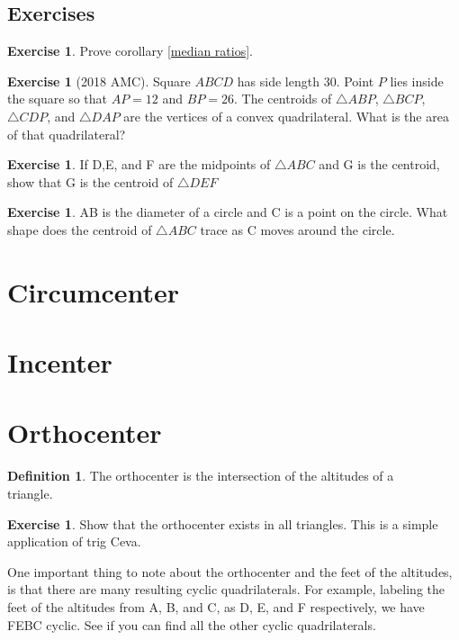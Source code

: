 \documentclass[letterpaper]{article}
\theoremstyle{plain}
\theoremstyle{definition}
\newtheorem{definition}[thm]{Definition}
\newtheorem{exercise}[thm]{Exercise}
\theoremstyle{remark}
\begin{document}
    \subsection*{Exercises}
    \begin{exercise}
        Prove corollary \ref{median ratios}.
    \end{exercise}
    \begin{exercise}[2018 AMC]
        Square $ABCD$ has side length $30$. Point $P$ lies inside the square so that $AP = 12$ and $BP = 26$. The centroids of $\triangle{ABP}$, $\triangle{BCP}$, $\triangle{CDP}$, and $\triangle{DAP}$ are the vertices of a convex quadrilateral. What is the area of that quadrilateral?
    \end{exercise}
    \begin{exercise} If D,E, and F are the midpoints of $\triangle ABC$ and G is the centroid, show that G is the centroid of $\triangle DEF$
    \end{exercise}
    \begin{exercise} AB is the diameter of a circle and C is a point on the circle. What shape does the centroid of $\triangle ABC$ trace as C moves around the circle.
    \end{exercise}

\section{Circumcenter}
\section{Incenter}
\section{Orthocenter}
\begin{mdframed}
    \begin{definition}
        The orthocenter is the intersection of the altitudes of a \\triangle.
   \end{definition} 
\end{mdframed}
\begin{exercise}
    Show that the orthocenter exists in all triangles. This is a simple application of trig Ceva.
\end{exercise}

One important thing to note about the orthocenter and the feet of the altitudes, is that there are many resulting cyclic quadrilaterals.
For example, labeling the feet of the altitudes from A, B, and C, as D, E, and F respectively, we have FEBC cyclic. See if you can find all the other cyclic quadrilaterals. 
\end{document}
